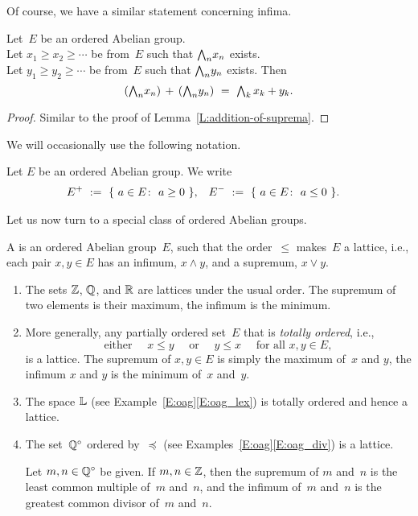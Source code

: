 \documentclass[main.tex]{subfiles}
\begin{document}
\noindent
Of course,
we have a similar statement concerning infima.
\begin{lem}
\label{L:addition-of-infima}
Let~$E$ be an ordered Abelian group.\\
Let $x_1 \geq x_2 \geq \dotsb$
be from~$E$ such that $\textstyle{\bigwedge}_n x_n$ exists.\\
Let $y_1 \geq y_2 \geq \dotsb$
be from~$E$ such that $\textstyle{\bigwedge}_n y_n$ exists.
Then
\begin{equation*}
(\bw_n x_n) \,+\, (\bw_n y_n)
\ =\ 
\bw_k\, x_k + y_k.
\end{equation*}
\end{lem}
\begin{proof}
Similar to the proof of Lemma~\ref{L:addition-of-suprema}.
\end{proof}
%
%
\noindent
We will occasionally use the following notation.
\begin{dfn}
Let $E$ be an ordered Abelian group.
We write
\begin{align*}
E^+ \ &:=\ \{\  a\in E\colon\  a\geq 0\ \},&
E^- \ &:=\ \{\  a\in E\colon\  a\leq 0\ \}.
\end{align*}
\end{dfn}
%
\noindent
Let us now turn to a special class of ordered Abelian groups.
%
%
\begin{dfn}
\label{D:loag}
A 
is an ordered Abelian group~$E$,
such that the order~$\leq$ 
makes~$E$ a lattice,
i.e., each pair $x,y\in E$
has an infimum, $x\wedge y$,
and a supremum, $x\vee y$.
\end{dfn}
\begin{exs}
\label{E:loag}
\begin{enumerate}
\item
The sets
$\mathbb{Z}$, $\mathbb{Q}$, and $\mathbb{R}$ are lattices
under the usual order.
The supremum of two elements is their maximum,
the infimum is the minimum.

\item
More generally,
any partially ordered set~$E$
that is \emph{totally ordered},
i.e.,
\begin{equation*}
\text{either } \quad x\leq y\quad\text{ or } 
\quad y\leq x\quad \text{ for all }x,y\in E,
\end{equation*}
is a lattice.
The supremum of $x,y\in E$ is simply the maximum of~$x$ and $y$,
the infimum $x$ and $y$ is the minimum of~$x$ and~$y$.

\item
The space $\mathbb{L}$
(see Example~\ref{E:oag}\ref{E:oag_lex})
is totally ordered and hence a lattice.

\item
\label{E:loag_div}
The set~$\mathbb{Q}^\circ$ ordered by~$\preccurlyeq$
(see Examples~\ref{E:oag}\ref{E:oag_div})
is a lattice.

Let $m,n\in \mathbb{Q}^\circ$ be given.
If $m,n\in \mathbb{Z}$, then the supremum of $m$ and~$n$
is the least common multiple of~$m$ and~$n$,
and the infimum of~$m$ and~$n$ is the greatest common divisor
of~$m$ and~$n$.

\end{enumerate}
\end{exs}
\end{document}
